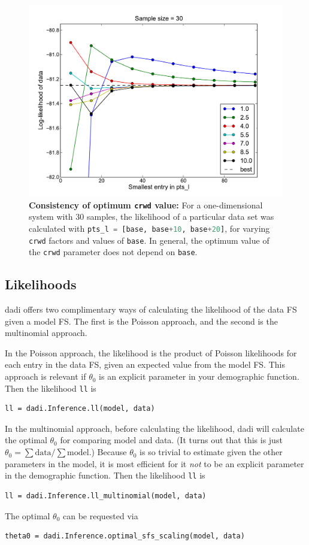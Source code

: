\documentclass[12pt]{article}
\makeatletter
\newcommand{\dadi}{dadi\xspace}
\newcommand{\py}[1]{\lstinline[language=Python, showstringspaces=False]@#1@}
\makeatother
\begin{document}
\begin{figure}
\centering
\includegraphics[scale=0.37]{consistent_crwd}
\caption{\textbf{Consistency of optimum \py{crwd} value:} For a one-dimensional system with 30 samples, the likelihood of a particular data set was calculated with \py{pts_l = [base, base+10, base+20]}, for varying \py{crwd} factors and values of \py{base}. In general, the optimum value of the \py{crwd} parameter does not depend on \py{base}.\label{fig:consistent_crwd}}
\end{figure}

\subsection{Likelihoods}

\dadi offers two complimentary ways of calculating the likelihood of the data FS given a model FS.
The first is the Poisson approach, and the second is the multinomial approach.

In the Poisson approach, the likelihood is the product of Poisson likelihoods for each entry in the data FS, given an expected value from the model FS.
This approach is relevant if $\theta_0$ is an explicit parameter in your demographic function.
Then the likelihood \py{ll} is
\begin{lstlisting}
ll = dadi.Inference.ll(model, data)
\end{lstlisting}

In the multinomial approach, before calculating the likelihood, \dadi will calculate the optimal $\theta_0$ for comparing model and data.
(It turns out that this is just $\theta_0 = \sum \text{data} / \sum \text{model}$.)
Because $\theta_0$ is so trivial to estimate given the other parameters in the model, it is most efficient for it \emph{not} to be an explicit parameter in the demographic function.
Then the likelihood \py{ll} is
\begin{lstlisting}
ll = dadi.Inference.ll_multinomial(model, data)
\end{lstlisting}
The optimal $\theta_0$ can be requested via
\begin{lstlisting}
theta0 = dadi.Inference.optimal_sfs_scaling(model, data)
\end{lstlisting}
\end{document}
